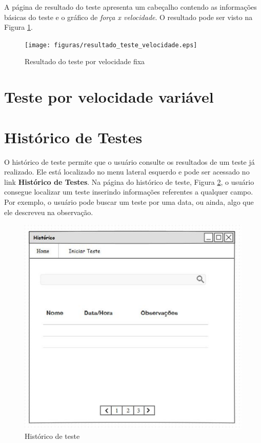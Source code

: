 A página de resultado do teste apresenta um cabeçalho contendo as informações básicas do teste e o gráfico de \textit{força x velocidade}. O resultado pode ser visto na Figura \ref{img:resultado}.

\begin{figure}[h]
	\centering
	\label{img:resultado}
		\texttt{[image: figuras/resultado\_teste\_velocidade.eps]}
	\caption{Resultado do teste por velocidade fixa}
\end{figure}

\section{Teste por velocidade variável}


\section{Histórico de Testes}

O histórico de teste permite que o usuário consulte os resultados de um teste já realizado. Ele está localizado no menu lateral esquerdo e pode ser acessado no link \textbf{Histórico de Testes}. Na página do histórico de teste, Figura \ref{img:historico}, o usuário consegue localizar um teste inserindo informações referentes a qualquer campo. Por exemplo, o usuário pode buscar um teste por uma data, ou ainda, algo que ele descreveu na observação. 

\begin{figure}[h]
	\centering
	\label{img:historico}
		\includegraphics[width=1\textwidth]{figuras/historico.eps}
	\caption{Histórico de teste}
\end{figure}

